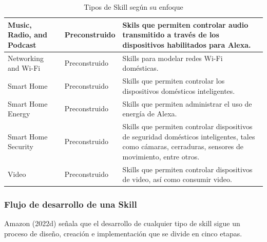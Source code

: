 \begin{table}
\begin{center}
\begin{tabular}{ | p{4cm} | p{4cm} | p{8cm} | }
      Music, Radio, and Podcast & Preconstruido & Skils que permiten controlar audio transmitido a través de los dispositivos habilitados para Alexa. \\ \hline
      Networking and Wi-Fi & Preconstruido & Skills para modelar redes Wi-Fi domésticas. \\ \hline
      Smart Home & Preconstruido & Skills que permiten controlar los dispositivos domésticos inteligentes. \\ \hline
      Smart Home Energy & Preconstruido & Skills que permiten administrar el uso de energía de Alexa. \\ \hline
      Smart Home Security & Preconstruido & Skills que permiten controlar dispositivos de seguridad domésticos inteligentes, tales como cámaras, cerraduras, sensores de movimiento, entre otros. \\ \hline
      Video & Preconstruido & Skills que permiten controlar dispositivos de video, así como consumir video. \\ \hline
    \end{tabular}
    \caption{Tipos de Skill según su enfoque}
    \label{tab:t41}
  \end{center}
\end{table}


\subsubsection{Flujo de desarrollo de una Skill}
\label{FlujoSkillcapIV}

Amazon (2022d) señala que el desarrollo de cualquier tipo de skill sigue un proceso de diseño, creación e implementación que se divide en cinco etapas.

